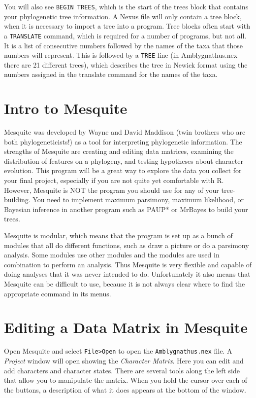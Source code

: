 \documentclass[11pt]{article}
\begin{document}
You will also see \texttt{BEGIN TREES}, which is the start of the trees block that contains your phylogenetic tree information. 
A Nexus file will only contain a tree block, when it is necessary to import a tree into a program. 
Tree blocks often start with a \texttt{TRANSLATE} command, which is required for a number of programs, but not all. 
It is a list of consecutive numbers followed by the names of the taxa that those numbers will represent. 
This is followed by a \texttt{TREE} line (in Amblygnathus.nex there are 21 different trees), 
which describes the tree in Newick format using the numbers assigned in the translate command for the names of the taxa.

\section{Intro to Mesquite}

Mesquite was developed by Wayne and David Maddison 
(twin brothers who are both phylogeneticists!)
as a tool for interpreting phylogenetic information. 
The strengths of Mesquite are creating and editing data matrices, 
examining the distribution of features on a phylogeny, 
and testing hypotheses about character evolution. 
This program will be a great way to explore the data you collect for your final project, 
especially if you are not quite yet comfortable with R. 
However, Mesquite is NOT the program you should use for any of your tree-building. 
You need to implement maximum parsimony, maximum likelihood, or Bayesian inference in another program such as PAUP* or MrBayes to build your trees.

Mesquite is modular, which means that the program is set up as a bunch of modules 
that all do different functions, such as draw a picture or do a parsimony analysis. 
Some modules use other modules and the modules are used in combination to perform an analysis. 
Thus Mesquite is very flexible and capable of doing analyses 
that it was never intended to do. 
Unfortunately it also means that Mesquite can be difficult to use, 
because it is not always clear where to find the appropriate command in its menus. 

\section{Editing a Data Matrix in Mesquite}

Open Mesquite and select \texttt{File>Open} to open the \texttt{Amblygnathus.nex} file.
A \textit{Project} window will open showing the \textit{Character Matrix}. 
Here you can edit and add characters and character states. 
There are several tools along the left side that allow you
to manipulate the matrix. When you hold the cursor over each of the buttons, a description of what it does appears at the bottom of the window.
\end{document}
